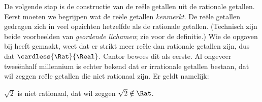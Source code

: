 \documentclass[../../../include/open-logic-section]{subfiles}
\begin{document}
De volgende stap is de constructie van de reële getallen uit de
rationale getallen. Eerst moeten we begrijpen wat de reële getallen
\emph{kenmerkt}.
De reële getallen gedragen zich in veel opzichten hetzelfde als de
rationale getallen. (Technisch zijn beide voorbeelden van \emph{geordende
lichamen}; zie  voor de definitie.) Wie de
opgaven bij  heeft gemaakt, weet dat er strikt
meer reële dan rationale getallen zijn, dus dat
$\cardless{\Rat}{\Real}$. Cantor bewees dit als eerste. Al ongeveer
tweeënhalf millennium is echter bekend dat er irrationale getallen
bestaan, dat wil zeggen reële getallen die niet rationaal zijn. Er
geldt namelijk:
\begin{thm}
$\sqrt{2}$ is niet rationaal, dat wil zeggen $\sqrt{2} \notin \Rat$.
\end{thm}
\end{document}
